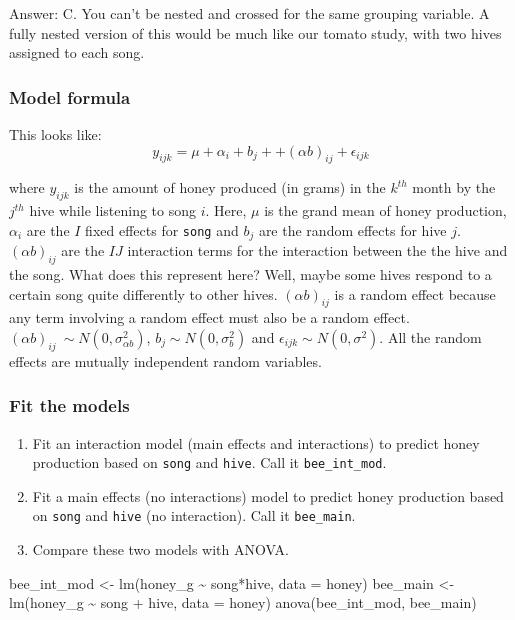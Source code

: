 \documentclass[
  openany]{book}
\newenvironment{Shaded}{\begin{snugshade}}{\end{snugshade}}
\newcommand{\AttributeTok}[1]{\textcolor[rgb]{0.77,0.63,0.00}{#1}}
\newcommand{\FunctionTok}[1]{\textcolor[rgb]{0.00,0.00,0.00}{#1}}
\newcommand{\NormalTok}[1]{#1}
\newcommand{\OtherTok}[1]{\textcolor[rgb]{0.56,0.35,0.01}{#1}}
\newcommand{\SpecialCharTok}[1]{\textcolor[rgb]{0.00,0.00,0.00}{#1}}
\providecommand{\tightlist}{%
  \setlength{\itemsep}{0pt}\setlength{\parskip}{0pt}}
\begin{document}
Answer: C. You can't be nested and crossed for the same grouping variable. A fully nested version of this would be much like our tomato study, with two hives assigned to each song.

\hypertarget{model-formula-1}{%
\subsubsection{Model formula}\label{model-formula-1}}

This looks like:
\[ y_{ijk} = \mu + \alpha_i + b_{j} + + (\alpha b)_{ij} + \epsilon_{ijk}\]

where \(y_{ijk}\) is the amount of honey produced (in grams) in the \(k^{th}\) month by the \(j^{th}\) hive while listening to song \(i\). Here, \(\mu\) is the grand mean of honey production, \(\alpha_i\) are the \(I\) fixed effects for \texttt{song} and \(b_j\) are the random effects for hive \(j\). \((\alpha b)_{ij}\) are the \(IJ\) interaction terms for the interaction between the the hive and the song. What does this represent here? Well, maybe some hives respond to a certain song quite differently to other hives. \((\alpha b)_{ij}\) is a random effect because any term involving a random effect must also be a random effect. \((\alpha b)_{ij} ~ \sim N(0, \sigma^2_{\alpha b})\), \(b_j \sim N(0, \sigma_b^2)\) and \(\epsilon_{ijk} \sim N(0, \sigma^2)\). All the random effects are mutually independent random variables.

\hypertarget{fit-the-models}{%
\subsubsection{Fit the models}\label{fit-the-models}}

\begin{enumerate}
\def\labelenumi{\arabic{enumi}.}
\tightlist
\item
  Fit an interaction model (main effects and interactions) to predict honey production based on \texttt{song} and \texttt{hive}. Call it \texttt{bee\_int\_mod}.\\
\item
  Fit a main effects (no interactions) model to predict honey production based on \texttt{song} and \texttt{hive} (no interaction). Call it \texttt{bee\_main}.\\
\item
  Compare these two models with ANOVA.
\end{enumerate}

\begin{Shaded}
\begin{Highlighting}[]
\NormalTok{bee\_int\_mod }\OtherTok{\textless{}{-}} \FunctionTok{lm}\NormalTok{(honey\_g }\SpecialCharTok{\textasciitilde{}}\NormalTok{ song}\SpecialCharTok{*}\NormalTok{hive, }\AttributeTok{data =}\NormalTok{ honey)}
\NormalTok{bee\_main }\OtherTok{\textless{}{-}} \FunctionTok{lm}\NormalTok{(honey\_g }\SpecialCharTok{\textasciitilde{}}\NormalTok{ song }\SpecialCharTok{+}\NormalTok{ hive, }\AttributeTok{data =}\NormalTok{ honey)}
\FunctionTok{anova}\NormalTok{(bee\_int\_mod, bee\_main)}
\end{Highlighting}
\end{Shaded}
\end{document}
